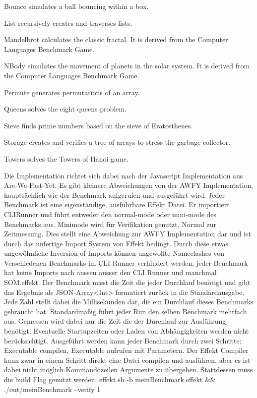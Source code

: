 Bounce simulates a ball bouncing within a box.

List recursively creates and traverses lists.

Mandelbrot calculates the classic fractal. It is derived from the Computer Languages Benchmark Game.

NBody simulates the movement of planets in the solar system. It is derived from the Computer Languages Benchmark Game.

Permute generates permutations of an array.

Queens solves the eight queens problem.

Sieve finds prime numbers based on the sieve of Eratosthenes.

Storage creates and verifies a tree of arrays to stress the garbage collector.

Towers solves the Towers of Hanoi game.

Die Implementation richtet sich dabei nach der Javascript Implementation aus Are-We-Fast-Yet.
Es gibt kleinere Abweichungen von der AWFY Implementation, hauptsächlich wie der Benchmark aufgerufen und ausgeführt wird. 
Jeder Benchmark ist eine eigenständige, ausführbare Effekt Datei. Er importiert CLIRunner und führt entweder den normal-mode oder mini-mode des Benchmarks aus. Minimode wird für Verifikation genutzt, Normal zur Zeitmessung.
Dies stellt eine Abweichung zur AWFY Implementation dar und ist durch das unfertige Import System von Effekt bedingt.
Durch diese etwas ungewöhnliche Inversion of Imports können ungewollte Nameclashes von Verschiedenen Benchmarks im CLI Runner verhindert werden, jeder Benchmark hat keine Imports nach aussen ausser den CLI Runner und manchmal SOM.effekt.
Der Benchmark misst die Zeit die jeder Durchlauf benötigt und gibt das Ergebnis als JSON-Array<Int> formatiert zurück in die Standardausgabe. Jede Zahl stellt dabei die Millisekunden dar, die ein Durchlauf dieses Benchmarks gebraucht hat.
Standardmäßig führt jeder Run den selben Benchmark mehrfach aus.
Gemessen wird dabei nur die Zeit die der Durchlauf zur Ausführung benötigt. Eventuelle Startupzeiten oder Laden von Abhängigkeiten werden nicht berücksichtigt.
Ausgeführt werden kann jeder Benchmark durch zwei Schritte: Executable compilen, Executable aufrufen mit Parametern.
Der Effekt Compiler kann zwar in einem Schritt direkt eine Datei compilen und ausführen, aber es ist dabei nicht möglich Kommandozeilen Argumente zu übergeben.
Stattdessen muss die build Flag genutzt werden:
effekt.sh -b meinBenchmark.effekt && ./out/meinBenchmark --verify 1

